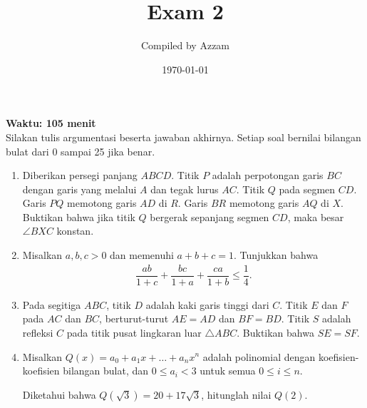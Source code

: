 \documentclass[12pt]{scrartcl}
\title{Exam 2}
\author{Compiled by Azzam}
\date{\today}
\begin{document}
\maketitle

\renewcommand*\contentsname{Daftar Isi}
\tableofcontents

\newpage
\textbf{Waktu: 105 menit}\\
Silakan tulis argumentasi beserta jawaban akhirnya. Setiap soal bernilai bilangan bulat dari 0 sampai 25 jika benar.
\begin{enumerate}[resume]
\item Diberikan persegi panjang $ABCD$. Titik $P$ adalah perpotongan garis $BC$ dengan garis yang melalui $A$ dan tegak lurus $AC$. Titik $Q$ pada segmen $CD$. Garis $PQ$ memotong garis $AD$ di $R$. Garis $BR$ memotong garis $AQ$ di $X$. Buktikan bahwa jika titik $Q$ bergerak sepanjang segmen $CD$, maka besar $\angle BXC$ konstan.

\item Misalkan $a,b,c > 0$ dan memenuhi $a+b+c=1$. Tunjukkan bahwa
\begin{align*}
\dfrac{ab}{1+c}+\dfrac{bc}{1+a}+\dfrac{ca}{1+b} \le \dfrac{1}{4}.
\end{align*}

\item Pada segitiga $ABC$, titik $D$ adalah kaki garis tinggi dari $C$. Titik $E$ dan $F$ pada $AC$ dan $BC$, berturut-turut $AE = AD$ dan $BF = BD$. Titik $S$ adalah refleksi $C$ pada titik pusat lingkaran luar $\triangle ABC$. Buktikan bahwa $SE=SF$.

\item Misalkan $Q(x) = a_0 + a_1x + \dots + a_nx^n$ adalah polinomial dengan koefisien-koefisien bilangan bulat, dan $0 \le a_i < 3$ untuk semua $0 \le i \le n$.

Diketahui bahwa $Q(\sqrt{3}) = 20 + 17\sqrt{3}$, hitunglah nilai $Q(2)$.
\end{enumerate}
\end{document}
